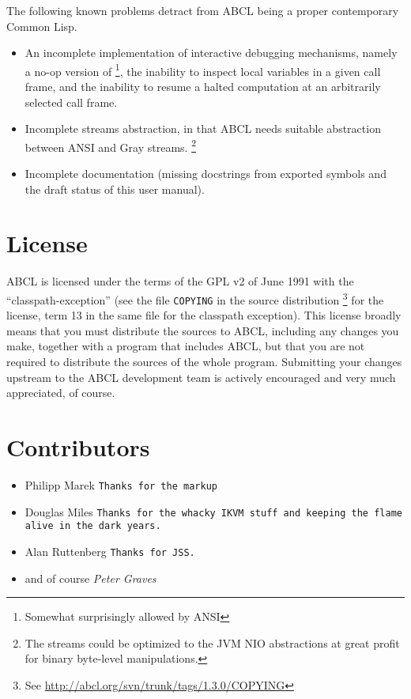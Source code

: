\documentclass[10pt]{book}
\begin{document}
The following known problems detract from \textsc{ABCL} being a proper
contemporary Common Lisp.
\begin{itemize}
\item An incomplete implementation of interactive debugging mechanisms,
  namely a no-op version of  \footnote{Somewhat surprisingly
    allowed by \textsc{ANSI}}, the inability to inspect local variables
  in a given call frame, and the inability to resume a halted
  computation at an arbitrarily selected call frame.
\item Incomplete streams abstraction, in that \textsc{ABCL} needs
  suitable abstraction between \textsc{ANSI} and Gray
  streams.  \footnote{The streams could be optimized to the
    \textsc{JVM} NIO \cite{nio} abstractions at great profit for
    binary byte-level manipulations.}
\item Incomplete documentation (missing docstrings from exported
  symbols and the draft status of this user manual).
\end{itemize}



\section{License}

\textsc{ABCL} is licensed under the terms of the \textsc{GPL} v2 of
June 1991 with the ``classpath-exception'' (see the file
\texttt{COPYING} in the source distribution \footnote{See
  \url{http://abcl.org/svn/trunk/tags/1.3.0/COPYING}} for
the license, term 13 in the same file for the classpath exception).
This license broadly means that you must distribute the sources to
ABCL, including any changes you make, together with a program that
includes ABCL, but that you are not required to distribute the sources
of the whole program.  Submitting your changes upstream to the ABCL
development team is actively encouraged and very much appreciated, of
course.

\section{Contributors}

\begin{itemize}
\item Philipp Marek \texttt{Thanks for the markup}
\item Douglas Miles \texttt{Thanks for the whacky IKVM stuff and keeping the flame alive
  in the dark years.}
\item Alan Ruttenberg \texttt{Thanks for JSS.}
\item and of course
\emph{Peter Graves}
\end{itemize}
\end{document}

